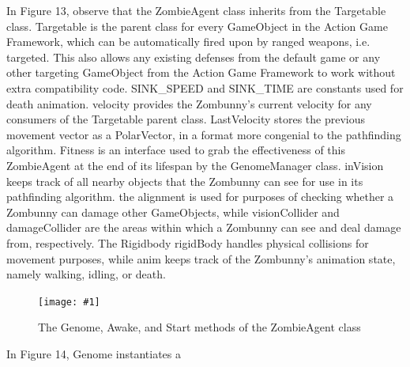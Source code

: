 \documentclass[letterpaper]{article}
\def\imfig#1#2{\begin{figure}[h] \centering \texttt{[image: \#1]} \caption{#2} \end{figure}}
\begin{document}
In Figure 13, observe that the ZombieAgent class inherits from the Targetable class. Targetable is the parent class for every GameObject in the Action Game Framework, which can be automatically fired upon by ranged weapons, i.e. targeted. This also allows any existing defenses from the default game or any other targeting GameObject from the Action Game Framework to work without extra compatibility code. SINK\_SPEED and SINK\_TIME are constants used for death animation. velocity provides the Zombunny's current velocity for any consumers of the Targetable parent class. LastVelocity stores the previous movement vector as a PolarVector, in a format more congenial to the pathfinding algorithm. Fitness is an interface used to grab the effectiveness of this ZombieAgent at the end of its lifespan by the GenomeManager class. inVision keeps track of all nearby objects that the Zombunny can see for use in its pathfinding algorithm. the alignment is used for purposes of checking whether a Zombunny can damage other GameObjects, while visionCollider and damageCollider are the areas within which a Zombunny can see and deal damage from, respectively. The Rigidbody rigidBody handles physical collisions for movement purposes, while anim keeps track of the Zombunny's animation state, namely walking, idling, or death.

\imfig{ZombieAgentInit}{The Genome, Awake, and Start methods of the ZombieAgent class}

In Figure 14, Genome instantiates a 
\end{document}
